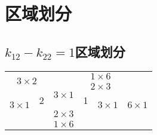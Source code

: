 \chapter{区域划分}

\section{\texorpdfstring{$k_{12} - k_{22} = 1$}的区域划分}

\begin{table}[h]
    \centering
    \begin{tabular}{|cccccccc|}
        \hline
        \multicolumn{2}{|c|}{\multirow{3}{*}{$3 \times 2$}} & \multicolumn{6}{c|}{$1 \times 6$}                                                                                                                                                                                                         \\
        \cline{3-8}
        \multicolumn{2}{|c|}{}                              & \multicolumn{1}{c|}{\multirow{3}{*}{$3 \times 1$}} & \multicolumn{3}{c|}{\multirow{2}{*}{$2 \times 3$}} & \multicolumn{2}{c|}{\multirow{6}{*}{$6 \times 1$}}                                                                              \\
        \multicolumn{2}{|c|}{}                              & \multicolumn{1}{c|}{}                              & \multicolumn{3}{c|}{}                              & \multicolumn{2}{c|}{}                                                                                                           \\
        \cline{1-2} \cline{4-6}
        \multicolumn{1}{|c|}{\multirow{3}{*}{$3 \times 1$}} & \multicolumn{1}{c|}{2}                             & \multicolumn{1}{c|}{}                              & \multicolumn{1}{c|}{1}                             & \multicolumn{2}{c|}{\multirow{3}{*}{$3 \times 1$}} & \multicolumn{2}{c|}{} \\
        \cline{2-4}
        \multicolumn{1}{|c|}{}                              & \multicolumn{3}{c|}{\multirow{2}{*}{$2 \times 3$}} & \multicolumn{2}{c|}{}                              & \multicolumn{2}{c|}{}                                                                                                           \\
        \multicolumn{1}{|c|}{}                              & \multicolumn{3}{c|}{}                              & \multicolumn{2}{c|}{}                              & \multicolumn{2}{c|}{}                                                                                                           \\
        \cline{1-6}
        \multicolumn{6}{|c|}{$1 \times 6$}                  & \multicolumn{2}{c|}{}                                                                                                                                                                                                                     \\
        \hline
    \end{tabular}
\end{table}


